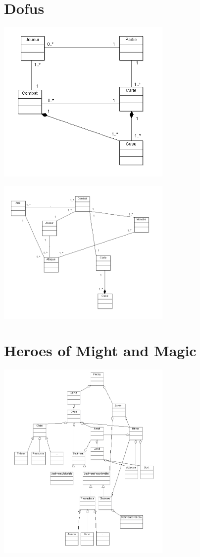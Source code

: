 \documentclass[a4paper,10pt]{report}
\begin{document}
	\section{Dofus}
	
		\includegraphics[width=320px]{diagrammes/classdiagram_dofus.png}
     
		\includegraphics[width=320px]{diagrammes/concept_dofus.png}


	\section{Heroes of Might and Magic}
	
		\includegraphics[width=320px]{diagrammes/heroes_of_might_and_magic.png}
\end{document}
